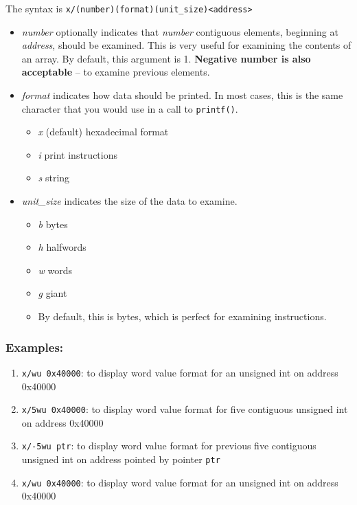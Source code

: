 The syntax is \texttt{x/(number)(format)(unit\_size)<address>}
\begin{itemize}
  \item \textit{number} optionally indicates that \textit{number} contiguous elements, beginning at \textit{address}, should be examined.
    This is very useful for examining the contents of an array. By default, this argument is 1.
    \textbf{Negative number is also acceptable} -- to examine previous elements.
  \item \textit{format} indicates how data should be printed.
    In most cases, this is the same character that you would use in a call to \texttt{printf()}.
  \begin{itemize}
    \item \textit{x} (default) hexadecimal format
    \item \textit{i} print instructions
    \item \textit{s} string
  \end{itemize}
  \item \textit{unit\_size} indicates the size of the data to examine.
  \begin{itemize}
    \item \textit{b} bytes
    \item \textit{h} halfwords
    \item \textit{w} words
    \item \textit{g} giant
    \item By default, this is bytes, which is perfect for examining instructions.
  \end{itemize}
\end{itemize}

\subsubsection{Examples:}

\begin{enumerate}
  \item \texttt{x/wu 0x40000}: to display word value format for an unsigned int on address 0x40000
  \item \texttt{x/5wu 0x40000}: to display word value format for five contiguous unsigned int on address 0x40000
  \item \texttt{x/-5wu ptr}: to display word value format for previous five contiguous unsigned int on address pointed by pointer \texttt{ptr}
  \item \texttt{x/wu 0x40000}: to display word value format for an unsigned int on address 0x40000
\end{enumerate}

